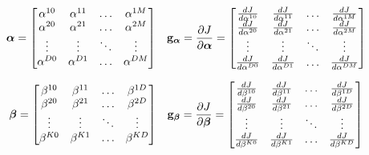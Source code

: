\begin{align}
    &\boldsymbol \alpha =
    \begin{bmatrix}
        \alpha^{10} & \alpha^{11} & \dots  & \alpha^{1M} \\
        \alpha^{20} & \alpha^{21} & \dots  & \alpha^{2M} \\
        \vdots      & \vdots      & \ddots & \vdots \\
        \alpha^{D0} & \alpha^{D1} & \dots  & \alpha^{DM}
    \end{bmatrix}
    &&
    \mathbf{g}_{\boldsymbol \alpha} = \frac{\partial J}{\partial \boldsymbol \alpha} = 
    \begin{bmatrix}
        \frac{d J}{d \alpha^{10}} & \frac{d J}{d \alpha^{11}} & \dots  & \frac{d J}{d \alpha^{1M}} \\
        \frac{d J}{d \alpha^{20}} & \frac{d J}{d \alpha^{21}} & \dots  & \frac{d J}{d \alpha^{2M}} \\
        \vdots      & \vdots      & \ddots & \vdots \\
        \frac{d J}{d \alpha^{D0}} & \frac{d J}{d \alpha^{D1}} & \dots  & \frac{d J}{d \alpha^{DM}}
    \end{bmatrix}
\end{align}

\begin{align}
    &\boldsymbol \beta =
    \begin{bmatrix}
        \beta^{10} & \beta^{11} & \dots  & \beta^{1D} \\
        \beta^{20} & \beta^{21} & \dots  & \beta^{2D} \\
        \vdots      & \vdots      & \ddots & \vdots \\
        \beta^{K0} & \beta^{K1} & \dots  & \beta^{KD}
    \end{bmatrix}
    &&
    \mathbf{g}_{\boldsymbol \beta} = \frac{\partial J}{\partial \boldsymbol \beta} = 
    \begin{bmatrix}
        \frac{d J}{d \beta^{10}} & \frac{d J}{d \beta^{11}} & \dots  & \frac{d J}{d \beta^{1D}} \\
        \frac{d J}{d \beta^{20}} & \frac{d J}{d \beta^{21}} & \dots  & \frac{d J}{d \beta^{2D}} \\
        \vdots      & \vdots      & \ddots & \vdots \\
        \frac{d J}{d \beta^{K0}} & \frac{d J}{d \beta^{K1}} & \dots  & \frac{d J}{d \beta^{KD}}
    \end{bmatrix}
\end{align}

